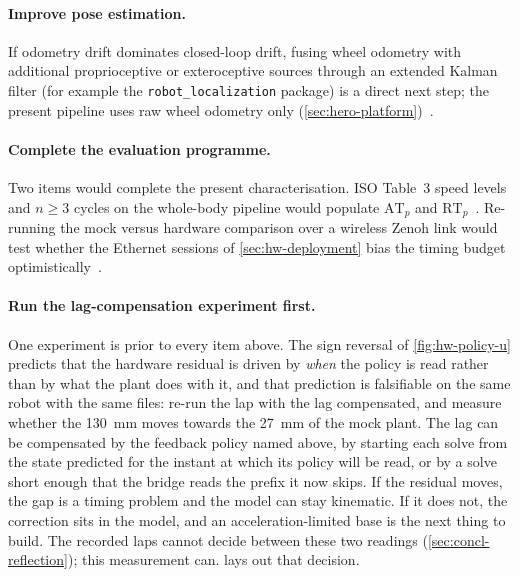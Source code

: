 \paragraph{Improve pose estimation.}
\begin{sloppypar}
If odometry drift dominates closed-loop drift, fusing wheel odometry
with additional proprioceptive or exteroceptive sources through an
extended Kalman filter (for example the \texttt{robot\_localization}
package) is a direct next step; the present pipeline uses raw wheel
odometry only
(\cref{sec:hero-platform})~\cite{Moore2015RobotLocalization}.
\end{sloppypar}

\paragraph{Complete the evaluation programme.}
Two items would complete the present characterisation. ISO
Table~3 speed levels and $n\ge 3$ cycles on the whole-body pipeline would
populate $\mathrm{AT}_{p}$ and $\mathrm{RT}_{p}$~\cite{ISO9283}.
Re-running the mock versus hardware comparison over a wireless Zenoh link
would test whether the Ethernet sessions of \cref{sec:hw-deployment} bias
the timing budget optimistically~\cite{zenoh}.

\paragraph{Run the lag-compensation experiment first.}
One experiment is prior to every item above. The sign reversal of
\cref{fig:hw-policy-u} predicts that the hardware residual is driven by
\emph{when} the policy is read rather than by what the plant does with
it, and that prediction is falsifiable on the same robot with the same
files: re-run the lap with the lag compensated, and measure whether the
\qty{130}{\milli\meter} moves towards the \qty{27}{\milli\meter} of the
mock plant. The lag can be compensated by the feedback policy named
above, by starting each solve from the state predicted for the instant
at which its policy will be read, or by a solve short enough that the
bridge reads the prefix it now skips. If the residual moves, the gap is
a timing problem and the model can stay kinematic. If it does not, the
correction sits in the model, and an acceleration-limited base is the
next thing to build. The recorded laps cannot decide between these two
readings (\cref{sec:concl-reflection}); this measurement can.
 lays out that decision.


